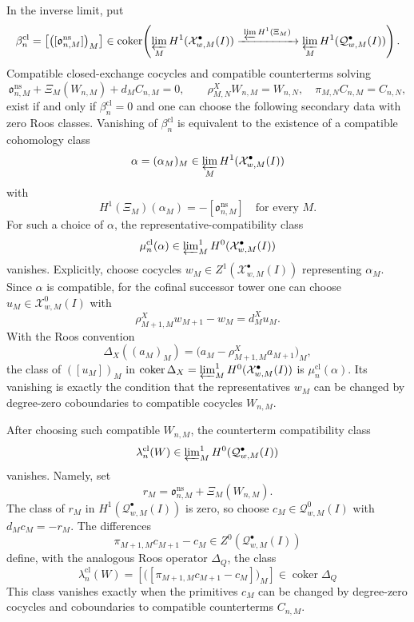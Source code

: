 \begin{thm}
  In the inverse limit, put
  \[
    \beta^{\mathrm{cl}}_n
      =
      \left[\bigl([\mathfrak o^{\mathrm{ns}}_{n,M}]\bigr)_M\right]
      \in
      \operatorname{coker}\!\left(
        \varprojlim_M H^1(\mathcal X^\bullet_{w,M}(I))
        \xrightarrow{\ \varprojlim H^1(\Xi_M)\ }
        \varprojlim_M H^1(\mathcal Q^\bullet_{w,M}(I))
      \right).
  \]
  Compatible closed-exchange cocycles and compatible counterterms solving
  \[
    \mathfrak o^{\mathrm{ns}}_{n,M}
      +\Xi_M(W_{n,M})+d_M C_{n,M}=0,\qquad
    \rho^X_{M,N}W_{n,M}=W_{n,N},\quad
    \pi_{M,N}C_{n,M}=C_{n,N},
  \]
  exist if and only if \(\beta^{\mathrm{cl}}_n=0\) and one can choose the
  following secondary data with zero Roos classes.  Vanishing of
  \(\beta^{\mathrm{cl}}_n\) is equivalent to the existence of a compatible
  cohomology class
  \[
    \alpha=(\alpha_M)_M
      \in\varprojlim_M H^1(\mathcal X^\bullet_{w,M}(I))
  \]
  with
  \[
    H^1(\Xi_M)(\alpha_M)
      =-[\mathfrak o^{\mathrm{ns}}_{n,M}]
      \quad\text{for every }M.
  \]
  For such a choice of \(\alpha\), the representative-compatibility class
  \[
    \mu^{\mathrm{cl}}_n(\alpha)
      \in
      \varprojlim\nolimits^1_M
      H^0(\mathcal X^\bullet_{w,M}(I))
  \]
  vanishes.  Explicitly, choose cocycles
  \(w_M\in Z^1(\mathcal X^\bullet_{w,M}(I))\) representing \(\alpha_M\).
  Since \(\alpha\) is compatible, for the cofinal successor tower one can
  choose \(u_M\in\mathcal X^0_{w,M}(I)\) with
  \[
    \rho^X_{M+1,M}w_{M+1}-w_M=d^X_M u_M.
  \]
  With the Roos convention
  \[
    \Delta_X((a_M)_M)
      =
      \bigl(a_M-\rho^X_{M+1,M}a_{M+1}\bigr)_M,
  \]
  the class of \(( [u_M] )_M\) in
  \(\operatorname{coker}\Delta_X
  =\varprojlim\nolimits^1_M H^0(\mathcal X^\bullet_{w,M}(I))\)
  is \(\mu^{\mathrm{cl}}_n(\alpha)\).  Its vanishing is exactly the
  condition that the representatives \(w_M\) can be changed by
  degree-zero coboundaries to compatible cocycles \(W_{n,M}\).

  After choosing such compatible \(W_{n,M}\), the counterterm
  compatibility class
  \[
    \lambda^{\mathrm{cl}}_n(W)
      \in
      \varprojlim\nolimits^1_M
      H^0(\mathcal Q^\bullet_{w,M}(I))
  \]
  vanishes.  Namely, set
  \[
    r_M=\mathfrak o^{\mathrm{ns}}_{n,M}+\Xi_M(W_{n,M}).
  \]
  The class of \(r_M\) in \(H^1(\mathcal Q^\bullet_{w,M}(I))\) is zero,
  so choose \(c_M\in\mathcal Q^0_{w,M}(I)\) with \(d_M c_M=-r_M\).  The
  differences
  \[
    \pi_{M+1,M}c_{M+1}-c_M
      \in Z^0(\mathcal Q^\bullet_{w,M}(I))
  \]
  define, with the analogous Roos operator \(\Delta_Q\), the class
  \[
    \lambda^{\mathrm{cl}}_n(W)
      =
      \left[\bigl(
      [\pi_{M+1,M}c_{M+1}-c_M]\bigr)_M\right]
      \in\operatorname{coker}\Delta_Q
  \]
  This class vanishes exactly when the primitives \(c_M\) can be changed by
  degree-zero cocycles and coboundaries to compatible counterterms
  \(C_{n,M}\).


\end{thm}
